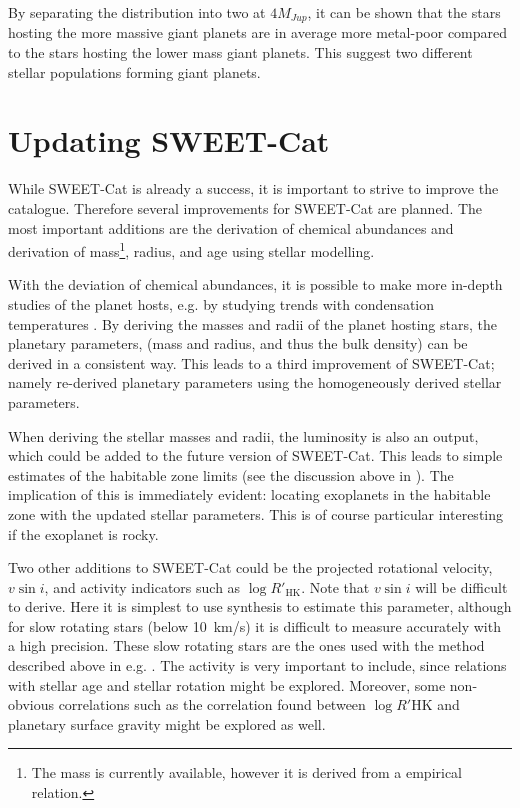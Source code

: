 By separating the distribution into two at $4M_{Jup}$, it can be shown \citep[see][for
details]{Santos2017} that the stars hosting the more massive giant planets are in average more
metal-poor compared to the stars hosting the lower mass giant planets. This suggest two different
stellar populations forming giant planets.


\section{Updating SWEET-Cat}

While SWEET-Cat is already a success, it is important to strive to improve the catalogue. Therefore
several improvements for SWEET-Cat are planned. The most important additions are the derivation of
chemical abundances and derivation of mass\footnote{The mass is currently available, however it is
derived from a empirical relation.}, radius, and age using stellar modelling.

With the deviation of chemical abundances, it is possible to make more in-depth studies of the
planet hosts, e.g. by studying trends with condensation temperatures \citep[see
e.g.][]{Adibekyan2016}. By deriving the masses and radii of the planet hosting stars, the planetary
parameters, (mass and radius, and thus the bulk density) can be derived in a consistent way. This
leads to a third improvement of SWEET-Cat; namely re-derived planetary parameters using the
homogeneously derived stellar parameters.

When deriving the stellar masses and radii, the luminosity is also an output, which could be added
to the future version of SWEET-Cat. This leads to simple estimates of the habitable zone limits (see
the discussion above in ). The implication of this is immediately evident: locating
exoplanets in the habitable zone with the updated stellar parameters. This is of course particular
interesting if the exoplanet is rocky.

Two other additions to SWEET-Cat could be the projected rotational velocity, $v\sin i$, and activity
indicators such as $\log R'_\mathrm{HK}$. Note that $v\sin i$ will be difficult to derive. Here it
is simplest to use synthesis to estimate this parameter, although for slow rotating stars (below
\SI{10}{km/s}) it is difficult to measure accurately with a high precision. These slow rotating
stars are the ones used with the method described above in e.g. . The
activity is very important to include, since relations with stellar age and stellar rotation might
be explored. Moreover, some non-obvious correlations such as the correlation found between $\log
R'\mathrm{HK}$ and planetary surface gravity \citep{Hartman2010,Figueira2014} might be explored as
well.

